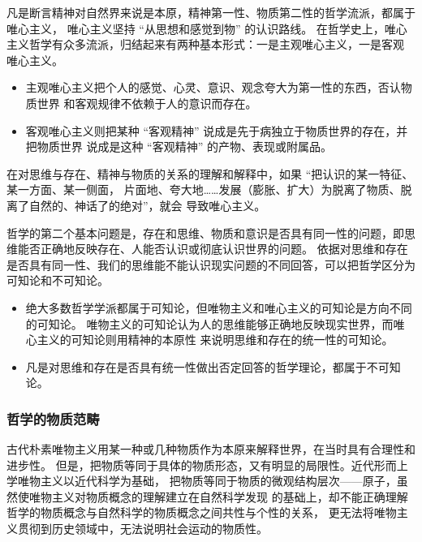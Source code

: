 \documentclass[utf-8, 10pt]{article}
\begin{document}
{    凡是断言精神对自然界来说是本原，精神第一性、物质第二性的哲学流派，都属于唯心主义，
    唯心主义坚持 “从思想和感觉到物” 的认识路线。
    在哲学史上，唯心主义哲学有众多流派，归结起来有两种基本形式：一是主观唯心主义，一是客观
    唯心主义。
    \begin{itemize}[itemsep=0pt]
        \item 主观唯心主义把个人的感觉、心灵、意识、观念夸大为第一性的东西，否认物质世界
        和客观规律不依赖于人的意识而存在。
        \item 客观唯心主义则把某种 “客观精神” 说成是先于病独立于物质世界的存在，并把物质世界
        说成是这种 “客观精神” 的产物、表现或附属品。
    \end{itemize}
    在对思维与存在、精神与物质的关系的理解和解释中，如果 “把认识的某一特征、某一方面、某一侧面，
    片面地、夸大地……发展（膨胀、扩大）为脱离了物质、脱离了自然的、神话了的绝对”，就会
    导致唯心主义。
    
    哲学的第二个基本问题是，存在和思维、物质和意识是否具有同一性的问题，即思维能否正确地反映存在、人能否认识或彻底认识世界的问题。
    依据对思维和存在是否具有同一性、我们的思维能不能认识现实问题的不同回答，可以把哲学区分为
    可知论和不可知论。
    \begin{itemize}[itemsep=0pt]
        \item 绝大多数哲学学派都属于可知论，但唯物主义和唯心主义的可知论是方向不同的可知论。
        唯物主义的可知论认为人的思维能够正确地反映现实世界，而唯心主义的可知论则用精神的本原性
        来说明思维和存在的统一性的可知论。
        \item 凡是对思维和存在是否具有统一性做出否定回答的哲学理论，都属于不可知论。
    \end{itemize}}

\subsubsection{哲学的物质范畴}

古代朴素唯物主义用某一种或几种物质作为本原来解释世界，在当时具有合理性和进步性。
但是，把物质等同于具体的物质形态，又有明显的局限性。近代形而上学唯物主义以近代科学为基础，
把物质等同于物质的微观结构层次——原子，虽然使唯物主义对物质概念的理解建立在自然科学发现
的基础上，却不能正确理解哲学的物质概念与自然科学的物质概念之间共性与个性的关系，
更无法将唯物主义贯彻到历史领域中，无法说明社会运动的物质性。
\end{document}
